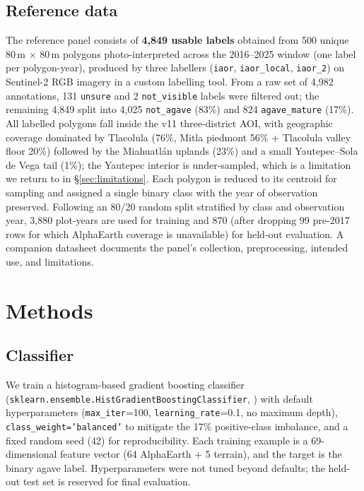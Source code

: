 \documentclass[10pt,a4paper]{article}
\begin{document}
\subsection{Reference data}

The reference panel consists of \textbf{4{,}849 usable labels}
obtained from 500 unique 80\,m $\times$ 80\,m polygons
photo-interpreted across the 2016--2025 window (one label per
polygon-year), produced by three labellers
(\texttt{iaor}, \texttt{iaor\_local}, \texttt{iaor\_2}) on
Sentinel-2 RGB imagery in a custom labelling tool. From a raw set of
4{,}982 annotations, 131 \texttt{unsure} and 2 \texttt{not\_visible}
labels were filtered out; the remaining 4{,}849 split into 4{,}025
\texttt{not\_agave} (83\%) and 824 \texttt{agave\_mature} (17\%). All
labelled polygons fall inside the v11 three-district AOI, with
geographic coverage dominated by Tlacolula (76\%, Mitla piedmont
56\% + Tlacolula valley floor 20\%) followed by the Miahuatlán
uplands (23\%) and a small Yautepec--Sola de Vega tail (1\%); the
Yautepec interior is under-sampled, which is a limitation we
return to in \S\ref{sec:limitations}. Each polygon is
reduced to its centroid for sampling and assigned a single binary
class with the year of observation preserved. Following an 80/20
random split stratified by class and observation year, 3{,}880
plot-years are used for training and 870 (after dropping 99 pre-2017
rows for which AlphaEarth coverage is unavailable) for held-out
evaluation. A companion datasheet documents the panel's collection,
preprocessing, intended use, and limitations.

\section{Methods}\label{sec:methods}

\subsection{Classifier}

We train a histogram-based gradient boosting classifier
(\texttt{sklearn.\allowbreak ensemble.\allowbreak HistGradient\allowbreak Boosting\allowbreak Classifier},
\citealt{pedregosa2011scikit}) with default hyperparameters
(\texttt{max\_iter}=100, \texttt{learning\_rate}=0.1, no maximum
depth), \texttt{class\_weight='balanced'} to mitigate the 17\%
positive-class imbalance, and a fixed random seed (42) for
reproducibility. Each training example is a 69-dimensional feature
vector (64 AlphaEarth + 5 terrain), and the target is the binary
agave label. Hyperparameters were not tuned beyond defaults; the
held-out test set is reserved for final evaluation.
\end{document}
